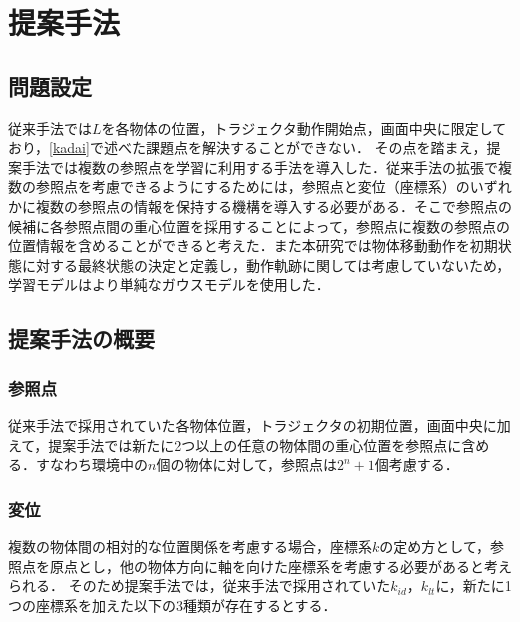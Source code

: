 ﻿%



\chapter{提案手法}

\section{問題設定}

従来手法では$L$を各物体の位置，トラジェクタ動作開始点，画面中央に限定しており，\ref{kadai}で述べた課題点を解決することができない．
その点を踏まえ，提案手法では複数の参照点を学習に利用する手法を導入した．従来手法の拡張で複数の参照点を考慮できるようにするためには，参照点と変位（座標系）のいずれかに複数の参照点の情報を保持する機構を導入する必要がある．そこで参照点の候補に各参照点間の重心位置を採用することによって，参照点に複数の参照点の位置情報を含めることができると考えた．また本研究では物体移動動作を初期状態に対する最終状態の決定と定義し，動作軌跡に関しては考慮していないため，学習モデルはより単純なガウスモデルを使用した．

\section{提案手法の概要}

\subsection{参照点}

従来手法で採用されていた各物体位置，トラジェクタの初期位置，画面中央に加えて，提案手法では新たに2つ以上の任意の物体間の重心位置を参照点に含める．すなわち環境中の$n$個の物体に対して，参照点は$2^{n}+1$個考慮する．

\subsection{変位}

複数の物体間の相対的な位置関係を考慮する場合，座標系$k$の定め方として，参照点を原点とし，他の物体方向に軸を向けた座標系を考慮する必要があると考えられる．
そのため提案手法では，従来手法で採用されていた$k_{id}$，$k_{lt}$に，新たに1つの座標系を加えた以下の3種類が存在するとする．

